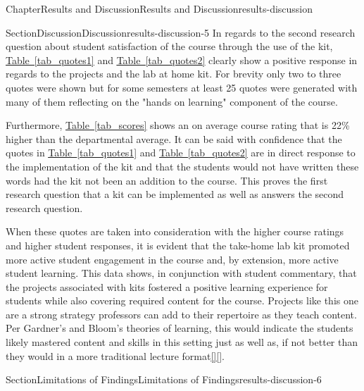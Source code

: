 \documentclass[oneside,10pt,]{book}
\newcommand{\xreffont}{\relax}
\newcommand{\linkhilite}[1]{\underline{#1}}
\numberwithin{equation}{section}
\begin{document}
\begin{chapterptx}{Chapter}{Results and Discussion}{}{Results and Discussion}{}{}{results-discussion}
\begin{sectionptx}{Section}{Discussion}{}{Discussion}{}{}{results-discussion-5}
In regards to the second research question about student satisfaction of the course through the use of the kit, \hyperref[tab_quotes1]{\linkhilite{Table~{\xreffont\ref{tab_quotes1}}}} and \hyperref[tab_quotes2]{\linkhilite{Table~{\xreffont\ref{tab_quotes2}}}} clearly show a positive response in regards to the projects and the lab at home kit. For brevity only two to three quotes were shown but for some semesters at least 25 quotes were generated with many of them reflecting on the "hands on learning" component of the course.%
\par
Furthermore, \hyperref[tab_scores]{\linkhilite{Table~{\xreffont\ref{tab_scores}}}} shows an on average course rating that is 22\% higher than the departmental average. It can be said with confidence that the quotes in \hyperref[tab_quotes1]{\linkhilite{Table~{\xreffont\ref{tab_quotes1}}}} and \hyperref[tab_quotes2]{\linkhilite{Table~{\xreffont\ref{tab_quotes2}}}} are in direct response to the implementation of the kit and that the students would not have written these words had the kit not been an addition to the course. This proves the first research question that a kit can be implemented as well as answers the second research question.%
\par
When these quotes are taken into consideration with the higher course ratings and higher student responses, it is evident that the take-home lab kit promoted more active student engagement in the course and, by extension, more active student learning. This data shows, in conjunction with student commentary, that the projects associated with kits fostered a positive learning experience for students while also covering required content for the course. Projects like this one are a strong strategy professors can add to their repertoire as they teach content. Per Gardner's and Bloom's theories of learning, this would indicate the students likely mastered content and skills in this setting just as well as, if not better than they would in a more traditional lecture format\hyperlink{Armstrong}{\linkhilite{[{\xreffont 19}]}}\hyperlink{Gardner}{\linkhilite{[{\xreffont 11}]}}.%
\end{sectionptx}
%
%
\typeout{************************************************}
\typeout{************************************************}
%
\begin{sectionptx}{Section}{Limitations of Findings}{}{Limitations of Findings}{}{}{results-discussion-6}

\end{sectionptx}
\end{chapterptx}
\end{document}
